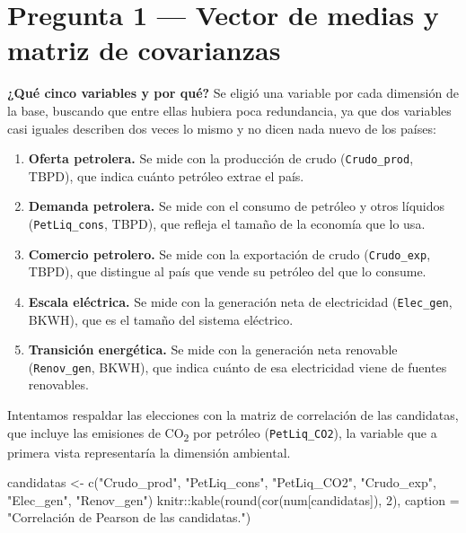 \documentclass[oneside, openany, fontset=libertinus]{mitthesis}
\newenvironment{Shaded}{\begin{snugshade}}{\end{snugshade}}
\newcommand{\AttributeTok}[1]{\textcolor[rgb]{0.40,0.45,0.13}{#1}}
\newcommand{\DecValTok}[1]{\textcolor[rgb]{0.68,0.00,0.00}{#1}}
\newcommand{\FunctionTok}[1]{\textcolor[rgb]{0.28,0.35,0.67}{#1}}
\newcommand{\NormalTok}[1]{\textcolor[rgb]{0.00,0.23,0.31}{#1}}
\newcommand{\OtherTok}[1]{\textcolor[rgb]{0.00,0.23,0.31}{#1}}
\newcommand{\SpecialCharTok}[1]{\textcolor[rgb]{0.37,0.37,0.37}{#1}}
\newcommand{\StringTok}[1]{\textcolor[rgb]{0.13,0.47,0.30}{#1}}
\providecommand{\tightlist}{\setlength{\itemsep}{0pt}\setlength{\parskip}{0pt}}
\begin{document}
\section{Pregunta 1 --- Vector de medias y matriz de
covarianzas}\label{p1}

\textbf{¿Qué cinco variables y por qué?} Se eligió una variable por cada
dimensión de la base, buscando que entre ellas hubiera poca redundancia,
ya que dos variables casi iguales describen dos veces lo mismo y no
dicen nada nuevo de los países:

\begin{enumerate}
\def\labelenumi{\alph{enumi}.}
\tightlist
\item
  \textbf{Oferta petrolera.} Se mide con la producción de crudo
  (\texttt{Crudo\_prod}, TBPD), que indica cuánto petróleo extrae el
  país.
\item
  \textbf{Demanda petrolera.} Se mide con el consumo de petróleo y otros
  líquidos (\texttt{PetLiq\_cons}, TBPD), que refleja el tamaño de la
  economía que lo usa.
\item
  \textbf{Comercio petrolero.} Se mide con la exportación de crudo
  (\texttt{Crudo\_exp}, TBPD), que distingue al país que vende su
  petróleo del que lo consume.
\item
  \textbf{Escala eléctrica.} Se mide con la generación neta de
  electricidad (\texttt{Elec\_gen}, BKWH), que es el tamaño del sistema
  eléctrico.
\item
  \textbf{Transición energética.} Se mide con la generación neta
  renovable (\texttt{Renov\_gen}, BKWH), que indica cuánto de esa
  electricidad viene de fuentes renovables.
\end{enumerate}

Intentamos respaldar las elecciones con la matriz de correlación de las
candidatas, que incluye las emisiones de CO\textsubscript{2} por
petróleo (\texttt{PetLiq\_CO2}), la variable que a primera vista
representaría la dimensión ambiental.

\Needspace{3.04in}

\begin{Shaded}
\begin{Highlighting}[]
\NormalTok{candidatas }\OtherTok{\textless{}{-}} \FunctionTok{c}\NormalTok{(}\StringTok{"Crudo\_prod"}\NormalTok{, }\StringTok{"PetLiq\_cons"}\NormalTok{, }\StringTok{"PetLiq\_CO2"}\NormalTok{,}
                \StringTok{"Crudo\_exp"}\NormalTok{, }\StringTok{"Elec\_gen"}\NormalTok{, }\StringTok{"Renov\_gen"}\NormalTok{)}
\NormalTok{knitr}\SpecialCharTok{::}\FunctionTok{kable}\NormalTok{(}\FunctionTok{round}\NormalTok{(}\FunctionTok{cor}\NormalTok{(num[candidatas]), }\DecValTok{2}\NormalTok{),}
             \AttributeTok{caption =} \StringTok{"Correlación de Pearson de las candidatas."}\NormalTok{)}
\end{Highlighting}
\end{Shaded}
\end{document}
